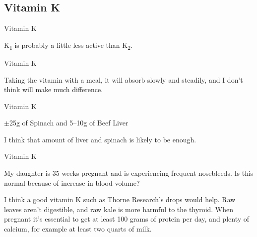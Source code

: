 \documentclass[11pt,oneside,openany,extrafontsizes]{memoir}
\begin{document}
\subsection{Vitamin K}

\begin{standalonequote}{Vitamin K}

    \begin{answer}
        K\textsubscript{1} is probably a little less active than K\textsubscript{2}.
    \end{answer}
\end{standalonequote}

\begin{standalonequote}{Vitamin K}

    \begin{answer}
        Taking the vitamin with a meal, it will absorb slowly and steadily, and I don't think will make much difference.
    \end{answer}
\end{standalonequote}

\begin{standalonequote}{Vitamin K}
    \begin{note}
        $\pm$25g of Spinach and 5--10g of Beef Liver
    \end{note}

    \begin{answer}
        I think that amount of liver and spinach is likely to be enough.
    \end{answer}
\end{standalonequote}

\begin{qaexchange}{Vitamin K}

    \begin{question}
        My daughter is 35 weeks pregnant and is experiencing frequent nosebleeds. Is this normal because of increase in blood volume?
    \end{question}

    \begin{answer}
        I think a good vitamin K such as Thorne Research's drops would help. Raw leaves aren't digestible, and raw kale is more harmful to the thyroid. When pregnant it's essential to get at least 100 grams of protein per day, and plenty of calcium, for example at least two quarts of milk.
    \end{answer}
\end{qaexchange}
\end{document}
